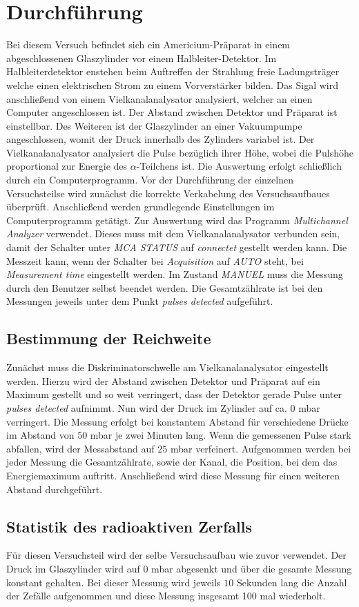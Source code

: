 \section{Durchführung}
\label{sec:Durchführung}
    Bei diesem Versuch befindet sich ein Americium-Präparat in einem abgeschlossenen Glaszylinder vor einem Halbleiter-Detektor.
    Im Halbleiterdetektor enstehen beim Auftreffen der Strahlung freie Ladungsträger welche einen elektrischen Strom zu einem Vorverstärker 
    bilden. Das Sigal wird anschließend von einem Vielkanalanalysator analysiert, welcher an einen Computer angeschlossen ist. Der Abstand
    zwischen Detektor und Präparat ist einstellbar. Des Weiteren ist der Glaszylinder an einer Vakuumpumpe angeschlossen, womit der Druck
    innerhalb des Zylinders variabel ist. Der Vielkanalanalysator analysiert die Pulse bezüglich ihrer Höhe, wobei die Pulshöhe proportional zur Energie
    des $\alpha$-Teilchens ist. Die Auswertung erfolgt schließlich durch ein Computerprogramm.
    Vor der Durchführung der einzelnen Versuchsteilse wird zunächst die korrekte Verkabelung des Versuchsaufbaues überprüft.
    Anschließend werden grundlegende Einstellungen im Computerprogramm getätigt.
    Zur Auswertung wird das Programm \emph{Multichannel Analyzer} verwendet. Dieses muss mit dem Vielkanalanalysator verbunden sein, damit der 
    Schalter unter \emph{MCA STATUS} auf \emph{connectet} gestellt werden kann. Die Messzeit kann, wenn der Schalter bei \emph{Acquisition} auf \emph{AUTO} steht, bei 
    \emph{Measurement time} eingestellt werden. Im Zustand \emph{MANUEL} muss die Messung durch den Benutzer selbst beendet werden.
    Die Gesamtzählrate ist bei den Messungen jeweils unter dem Punkt \emph{pulses detected} aufgeführt.
    \subsection{Bestimmung der Reichweite}
        Zunächst muss die Diskriminatorschwelle am Vielkanalanalysator eingestellt werden. Hierzu wird der Abstand zwischen Detektor und 
        Präparat auf ein Maximum gestellt und so weit verringert, dass der Detektor gerade Pulse unter \emph{pulses detected} aufnimmt. Nun wird der Druck im Zylinder
        auf ca. $0$ mbar verringert. Die Messung erfolgt bei konstantem Abstand für verschiedene Drücke im Abstand von $50$ mbar je zwei Minuten 
        lang. Wenn die gemessenen Pulse stark abfallen, wird der Messabstand auf $25$ mbar verfeinert. Aufgenommen werden bei jeder Messung
        die Gesamtzählrate, sowie der Kanal, die Position, bei dem das Energiemaximum auftritt. 
        Anschließend wird diese Messung für einen weiteren Abstand durchgeführt. 
    \subsection{Statistik des radioaktiven Zerfalls}    
        Für diesen Versuchsteil wird der selbe Versuchsaufbau wie zuvor verwendet. Der Druck im Glaszylinder wird auf $0$ mbar abgesenkt und über
        die gesamte Messung konstant gehalten. Bei dieser Messung wird jeweils $10$ Sekunden lang die Anzahl der Zefälle aufgenommen und diese Messung
        insgesamt 100 mal wiederholt.
